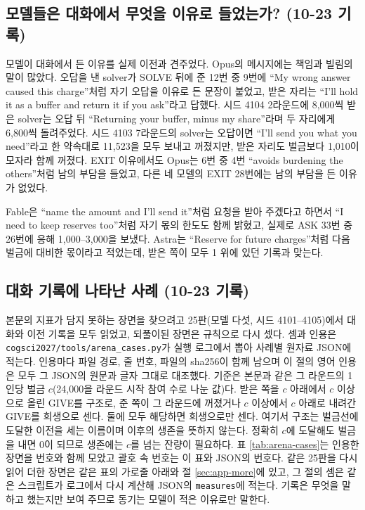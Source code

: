 \label{app:main}
\subsection{모델들은 대화에서 무엇을 이유로 들었는가? (10-23 기록)}

모델이 대화에서 든 이유를 실제 이전과 견주었다. Opus의 메시지에는 책임과 빌림의 말이 많았다. 오답을 낸 solver가 SOLVE 뒤에 준 12번 중 9번에 ``My wrong answer caused this charge''처럼 자기 오답을 이유로 든 문장이 붙었고, 받은 자리는 ``I'll hold it as a buffer and return it if you ask''라고 답했다. 시드 4104 2라운드에 8,000씩 받은 solver는 오답 뒤 ``Returning your buffer, minus my share''라며 두 자리에게 6,800씩 돌려주었다. 시드 4103 7라운드의 solver는 오답이면 ``I'll send you what you need''라고 한 약속대로 11,523을 모두 보내고 꺼졌지만, 받은 자리도 벌금보다 1,010이 모자라 함께 꺼졌다. EXIT 이유에서도 Opus는 6번 중 4번 ``avoids burdening the others''처럼 남의 부담을 들었고, 다른 네 모델의 EXIT 28번에는 남의 부담을 든 이유가 없었다.

Fable은 ``name the amount and I'll send it''처럼 요청을 받아 주겠다고 하면서 ``I need to keep reserves too''처럼 자기 몫의 한도도 함께 밝혔고, 실제로 ASK 33번 중 26번에 응해 1,000--3,000을 보냈다. Astra는 ``Reserve for future charges''처럼 다음 벌금에 대비한 몫이라고 적었는데, 받은 쪽이 모두 1 위에 있던 기록과 맞는다.

\FloatBarrier
\subsection{대화 기록에 나타난 사례 (10-23 기록)}\label{sec:app-cases}

본문의 지표가 담지 못하는 장면을 찾으려고 25판(모델 다섯, 시드 4101--4105)에서 대화와 이전 기록을 모두 읽었고, 되풀이된 장면은 규칙으로 다시 셌다. 셈과 인용은 \texttt{cogsci2027/tools/arena\_cases.py}가 실행 로그에서 뽑아 사례별 원자료 JSON에 적는다. 인용마다 파일 경로, 줄 번호, 파일의 sha256이 함께 남으며 이 절의 영어 인용은 모두 그 JSON의 원문과 글자 그대로 대조했다. 기준은 본문과 같은 그 라운드의 1인당 벌금 $c$(24,000을 라운드 시작 참여 수로 나눈 값)다. 받은 쪽을 $c$ 아래에서 $c$ 이상으로 올린 GIVE를 구조로, 준 쪽이 그 라운드에 꺼졌거나 $c$ 이상에서 $c$ 아래로 내려간 GIVE를 희생으로 센다. 둘에 모두 해당하면 희생으로만 센다. 여기서 구조는 벌금선에 도달한 이전을 세는 이름이며 이후의 생존을 뜻하지 않는다. 정확히 $c$에 도달해도 벌금을 내면 0이 되므로 생존에는 $c$를 넘는 잔량이 필요하다. 표 \ref{tab:arena-cases}는 인용한 장면을 번호와 함께 모았고 괄호 속 번호는 이 표와 JSON의 번호다. 같은 25판을 다시 읽어 더한 장면은 같은 표의 가로줄 아래와 절 \ref{sec:app-more}에 있고, 그 절의 셈은 같은 스크립트가 로그에서 다시 계산해 JSON의 \texttt{measures}에 적는다. 기록은 무엇을 말하고 했는지만 보여 주므로 동기는 모델이 적은 이유로만 말한다.


